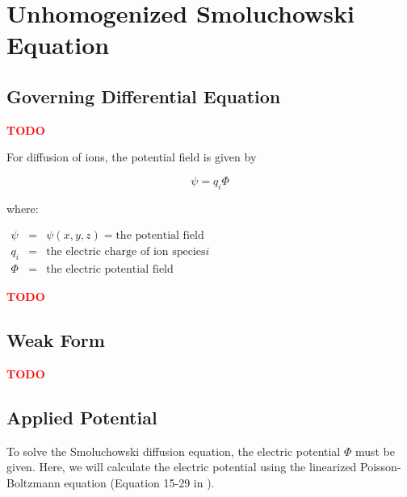 
\section{Unhomogenized Smoluchowski Equation}\label{sec:unhom_smol}

\subsection{Governing Differential Equation}\label{subsec:unhom_smol_gov}

\textcolor{red}{\textbf{TODO}}

For diffusion of ions, the potential field is given by

\begin{equation}
\psi=q_i \Phi
\end{equation}

where:

$\begin{array}{rcl}
\psi & = & \psi(x,y,z) = \text{the potential field} \\
q_i & = & \text{the electric charge of ion species} i\\
\Phi & = & \text{the electric potential field}
\end{array}$

\textcolor{red}{\textbf{TODO}}

\subsection{Weak Form}\label{subsec:unhom_smol_weak}

\textcolor{red}{\textbf{TODO}}

\subsection{Applied Potential}\label{subsec:unhom_smol_potential}

To solve the Smoluchowski diffusion equation, the electric potential $\Phi$ must be given.
Here, we will calculate the electric potential using the linearized Poisson-Boltzmann equation
(Equation 15-29 in \cite{McQuarrie-StatMech}).

